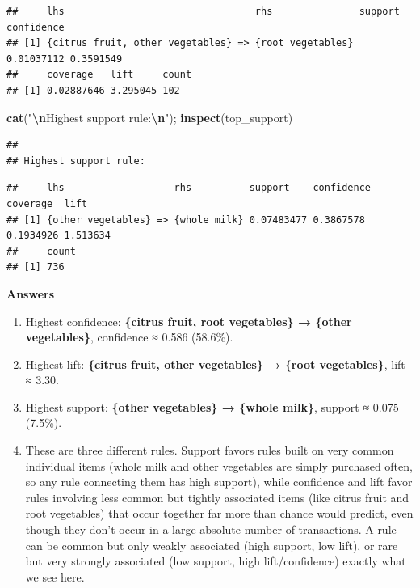 \documentclass[
]{article}
\newenvironment{Shaded}{\begin{snugshade}}{\end{snugshade}}
\newcommand{\FunctionTok}[1]{\textcolor[rgb]{0.13,0.29,0.53}{\textbf{#1}}}
\newcommand{\NormalTok}[1]{#1}
\newcommand{\SpecialCharTok}[1]{\textcolor[rgb]{0.81,0.36,0.00}{\textbf{#1}}}
\newcommand{\StringTok}[1]{\textcolor[rgb]{0.31,0.60,0.02}{#1}}
\providecommand{\tightlist}{%
  \setlength{\itemsep}{0pt}\setlength{\parskip}{0pt}}
\begin{document}
\begin{verbatim}
##     lhs                                 rhs               support    confidence
## [1] {citrus fruit, other vegetables} => {root vegetables} 0.01037112 0.3591549 
##     coverage   lift     count
## [1] 0.02887646 3.295045 102
\end{verbatim}

\begin{Shaded}
\begin{Highlighting}[]
\FunctionTok{cat}\NormalTok{(}\StringTok{"}\SpecialCharTok{\textbackslash{}n}\StringTok{Highest support rule:}\SpecialCharTok{\textbackslash{}n}\StringTok{"}\NormalTok{);  }\FunctionTok{inspect}\NormalTok{(top\_support)}
\end{Highlighting}
\end{Shaded}

\begin{verbatim}
## 
## Highest support rule:
\end{verbatim}

\begin{verbatim}
##     lhs                   rhs          support    confidence coverage  lift    
## [1] {other vegetables} => {whole milk} 0.07483477 0.3867578  0.1934926 1.513634
##     count
## [1] 736
\end{verbatim}

\textbf{Answers}

\begin{enumerate}
\def\labelenumi{\alph{enumi}.}
\tightlist
\item
  Highest confidence: \textbf{\{citrus fruit, root vegetables\} →
  \{other vegetables\}}, confidence ≈ 0.586 (58.6\%).
\item
  Highest lift: \textbf{\{citrus fruit, other vegetables\} → \{root
  vegetables\}}, lift ≈ 3.30.
\item
  Highest support: \textbf{\{other vegetables\} → \{whole milk\}},
  support ≈ 0.075 (7.5\%).
\item
  These are three different rules. Support favors rules built on very
  common individual items (whole milk and other vegetables are simply
  purchased often, so any rule connecting them has high support), while
  confidence and lift favor rules involving less common but tightly
  associated items (like citrus fruit and root vegetables) that occur
  together far more than chance would predict, even though they don't
  occur in a large absolute number of transactions. A rule can be common
  but only weakly associated (high support, low lift), or rare but very
  strongly associated (low support, high lift/confidence) exactly what
  we see here.
\end{enumerate}
\end{document}

